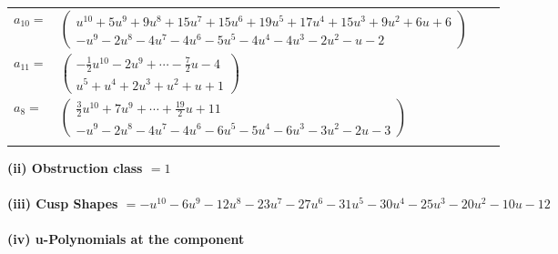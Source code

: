 \documentclass[1p]{elsarticle_modified}
\theoremstyle{definition}
\begin{document}
\begin{tabular}{m{7pt} m{180pt} m{7pt} m{180pt} }
\flushright $a_{10}=$&$\begin{pmatrix}u^{10}+5 u^9+9 u^8+15 u^7+15 u^6+19 u^5+17 u^4+15 u^3+9 u^2+6 u+6\\- u^9-2 u^8-4 u^7-4 u^6-5 u^5-4 u^4-4 u^3-2 u^2- u-2\end{pmatrix}$ \\
\flushright $a_{11}=$&$\begin{pmatrix}-\frac{1}{2} u^{10}-2 u^9+\cdots-\frac{7}{2} u-4\\u^5+u^4+2 u^3+u^2+u+1\end{pmatrix}$ \\
\flushright $a_{8}=$&$\begin{pmatrix}\frac{3}{2} u^{10}+7 u^9+\cdots+\frac{19}{2} u+11\\- u^9-2 u^8-4 u^7-4 u^6-6 u^5-5 u^4-6 u^3-3 u^2-2 u-3\end{pmatrix}$\\&\end{tabular}
\flushleft \textbf{(ii) Obstruction class $= 1$}\\~\\
\flushleft \textbf{(iii) Cusp Shapes $= - u^{10}-6 u^9-12 u^8-23 u^7-27 u^6-31 u^5-30 u^4-25 u^3-20 u^2-10 u-12$}\\~\\
\newpage\renewcommand{\arraystretch}{1}
\flushleft \textbf{(iv) u-Polynomials at the component}\newline \\
\end{document}
